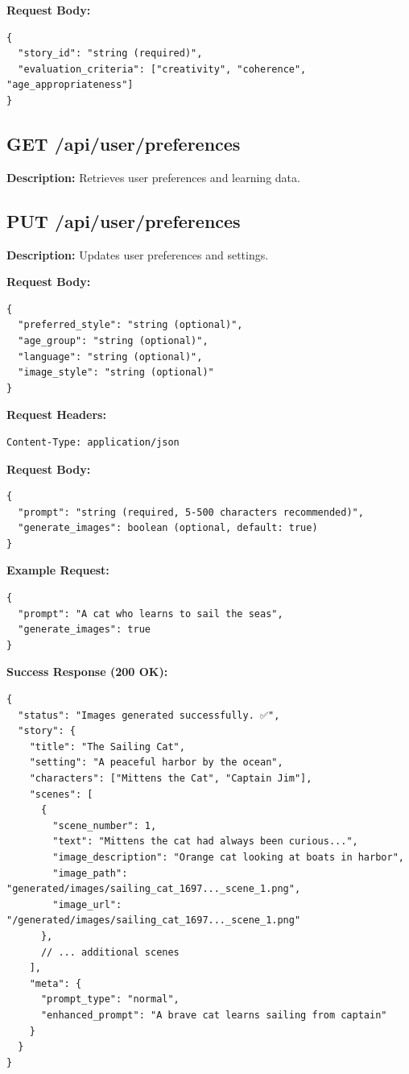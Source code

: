 {\textbf{Request Body:}
\begin{verbatim}
{
  "story_id": "string (required)",
  "evaluation_criteria": ["creativity", "coherence", "age_appropriateness"]
}
\end{verbatim}

\subsection{GET /api/user/preferences}
\textbf{Description:} Retrieves user preferences and learning data.

\subsection{PUT /api/user/preferences}
\textbf{Description:} Updates user preferences and settings.

\textbf{Request Body:}
\begin{verbatim}
{
  "preferred_style": "string (optional)",
  "age_group": "string (optional)",
  "language": "string (optional)",
  "image_style": "string (optional)"
}
\end{verbatim}

\textbf{Request Headers:}
\begin{verbatim}
Content-Type: application/json
\end{verbatim}

\textbf{Request Body:}
\begin{verbatim}
{
  "prompt": "string (required, 5-500 characters recommended)",
  "generate_images": boolean (optional, default: true)
}
\end{verbatim}

\textbf{Example Request:}
\begin{verbatim}
{
  "prompt": "A cat who learns to sail the seas",
  "generate_images": true
}
\end{verbatim}

\textbf{Success Response (200 OK):}
\begin{verbatim}
{
  "status": "Images generated successfully. ✅",
  "story": {
    "title": "The Sailing Cat",
    "setting": "A peaceful harbor by the ocean",
    "characters": ["Mittens the Cat", "Captain Jim"],
    "scenes": [
      {
        "scene_number": 1,
        "text": "Mittens the cat had always been curious...",
        "image_description": "Orange cat looking at boats in harbor",
        "image_path": "generated/images/sailing_cat_1697..._scene_1.png",
        "image_url": "/generated/images/sailing_cat_1697..._scene_1.png"
      },
      // ... additional scenes
    ],
    "meta": {
      "prompt_type": "normal",
      "enhanced_prompt": "A brave cat learns sailing from captain"
    }
  }
}
\end{verbatim}

}
